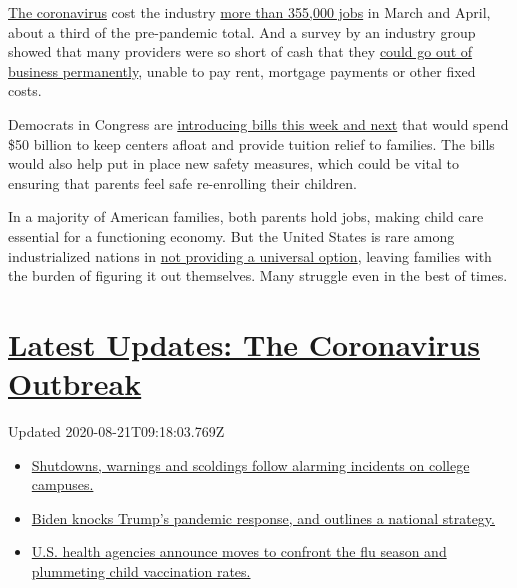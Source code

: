 \href{https://www.nytimes3xbfgragh.onion/news-event/coronavirus}{The
coronavirus} cost the industry
\href{https://www.bls.gov/news.release/empsit.t17.htm}{more than 355,000
jobs} in March and April, about a third of the pre-pandemic total. And a
survey by an industry group showed that many providers were so short of
cash that they
\href{https://www.naeyc.org/sites/default/files/globally-shared/downloads/PDFs/our-work/public-policy-advocacy/effects_of_coronavirus_on_child_care.final.pdf}{could
go out of business permanently}, unable to pay rent, mortgage payments
or other fixed costs.

Democrats in Congress are
\href{https://www.nytimes3xbfgragh.onion/2020/05/27/upshot/virus-childcare-bailout-democrats.html}{introducing
bills this week and next} that would spend \$50 billion to keep centers
afloat and provide tuition relief to families. The bills would also help
put in place new safety measures, which could be vital to ensuring that
parents feel safe re-enrolling their children.

In a majority of American families, both parents hold jobs, making child
care essential for a functioning economy. But the United States is rare
among industrialized nations in
\href{https://www.nytimes3xbfgragh.onion/2019/08/15/upshot/why-americans-resist-child-care.html}{not
providing a universal option}, leaving families with the burden of
figuring it out themselves. Many struggle even in the best of times.

\hypertarget{latest-updates-the-coronavirus-outbreak}{%
\section{\texorpdfstring{\href{https://www.nytimes3xbfgragh.onion/2020/08/20/world/coronavirus-covid.html?action=click\&pgtype=Article\&state=default\&region=MAIN_CONTENT_1\&context=storylines_live_updates}{Latest
Updates: The Coronavirus
Outbreak}}{Latest Updates: The Coronavirus Outbreak}}\label{latest-updates-the-coronavirus-outbreak}}

Updated 2020-08-21T09:18:03.769Z

\begin{itemize}
\tightlist
\item
  \href{https://www.nytimes3xbfgragh.onion/2020/08/20/world/coronavirus-covid.html?action=click\&pgtype=Article\&state=default\&region=MAIN_CONTENT_1\&context=storylines_live_updates\#link-68774d88}{Shutdowns,
  warnings and scoldings follow alarming incidents on college campuses.}
\item
  \href{https://www.nytimes3xbfgragh.onion/2020/08/20/world/coronavirus-covid.html?action=click\&pgtype=Article\&state=default\&region=MAIN_CONTENT_1\&context=storylines_live_updates\#link-26b58724}{Biden
  knocks Trump's pandemic response, and outlines a national strategy.}
\item
  \href{https://www.nytimes3xbfgragh.onion/2020/08/20/world/coronavirus-covid.html?action=click\&pgtype=Article\&state=default\&region=MAIN_CONTENT_1\&context=storylines_live_updates\#link-4e542da3}{U.S.
  health agencies announce moves to confront the flu season and
  plummeting child vaccination rates.}
\end{itemize}

